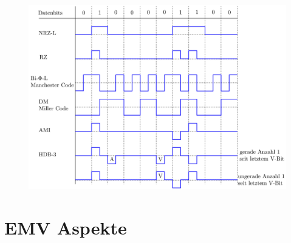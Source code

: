 \documentclass[
  10pt,
  a4paper,
  german]{article}
\numberwithin{equation}{section}
\begin{document}
\begin{figure}[H]

{\centering \includegraphics[width=12cm,height=\textheight]{images/04_Signalverlaufe_einiger_Leitungscodes.png}

}

\end{figure}

\hypertarget{emv-aspekte}{%
\section{EMV Aspekte}\label{emv-aspekte}}
\end{document}
